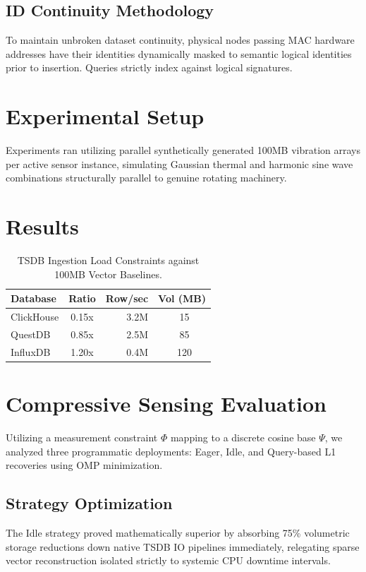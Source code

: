 \documentclass[10pt,twocolumn,letterpaper]{article}
\begin{document}
\subsection{ID Continuity Methodology}
To maintain unbroken dataset continuity, physical nodes passing MAC hardware addresses have their identities dynamically masked to semantic logical identities prior to insertion. Queries strictly index against logical signatures.

\section{Experimental Setup}
Experiments ran utilizing parallel synthetically generated 100MB vibration arrays per active sensor instance, simulating Gaussian thermal and harmonic sine wave combinations structurally parallel to genuine rotating machinery.

\section{Results}
\begin{table}[h]
\centering
\begin{tabular}{lcrc}
\toprule
Database & Ratio & Row/sec & Vol (MB) \\
\midrule
ClickHouse & 0.15x & 3.2M & ~15 \\
QuestDB & 0.85x & 2.5M & ~85 \\
InfluxDB & 1.20x & 0.4M & ~120 \\
\bottomrule
\end{tabular}
\caption{TSDB Ingestion Load Constraints against 100MB Vector Baselines.}
\end{table}

\section{Compressive Sensing Evaluation}
Utilizing a measurement constraint $\Phi$ mapping to a discrete cosine base $\Psi$, we analyzed three programmatic deployments: Eager, Idle, and Query-based L1 recoveries using OMP minimization.

\subsection{Strategy Optimization}
The Idle strategy proved mathematically superior by absorbing 75\% volumetric storage reductions down native TSDB IO pipelines immediately, relegating sparse vector reconstruction isolated strictly to systemic CPU downtime intervals.
\end{document}
